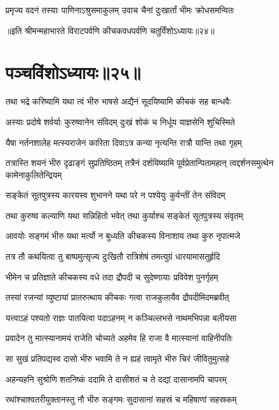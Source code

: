 \twolineshloka
{प्रमृज्य वदनं तस्याः पाणिनाऽश्रुसमाकुलम्}
{उवाच चैनां दुःखार्तां भीमः क्रोधसमन्वितः}

॥इति श्रीमन्महाभारते विराटपर्वणि कीचकवधपर्वणि चतुर्विंशोऽध्यायः॥२४॥

\chapter{पञ्चविंशोऽध्यायः॥२५॥}

\twolineshloka
{तथा भद्रे करिष्यामि यथा त्वं भीरु भाषसे}
{अद्यैनं सूदयिष्यामि कीचकं सह बान्धवैः}


\twolineshloka
{अस्याः प्रदोषे शर्वर्याः कुरुष्वानेन संविदम्}
{दुःखं शोकं च निर्धूय याज्ञसेनि शुचिस्मिते}


\twolineshloka
{यैषा नर्तनशालेह मत्स्यराजेन कारिता}
{दिवाऽत्र कन्या नृत्यन्ति रात्रौ यान्ति तथा गृहम्}


\threelineshloka
{तत्रास्ति शयनं भीरु दृढाङ्गं सुप्रतिष्ठितम्}
{तत्रैनं दर्शयिष्यामि पूर्वप्रेतान्पितामहान्}
{त्वद्दर्शनसमुत्थेन कामेनाकुलितेन्द्रियम्}


\twolineshloka
{सङ्केतं सूतपुत्रस्य कारयस्व शुभानने}
{यथा परे न पश्येयुः कुर्वन्तीं तेन संविदम्}


\twolineshloka
{तथा कुरुष्व कल्याणि यथा सन्निहितो भवेत्}
{तथा कुर्याश्च सङ्केतं सूतपुत्रस्य संवृतम्}


\twolineshloka
{आवयोः सङ्गमं भीरु यथा मर्त्यो न बुध्यति}
{कीचकस्य विनाशाय तथा कुरु नृपात्मजे}



\twolineshloka
{तत्र तौ कथयित्वा तु बाष्पमुत्सृज्य दुःखितौ}
{रात्रिशेषं तमत्युग्रं धारयामासतुर्हृदि}


\twolineshloka
{भीमेन च प्रतिज्ञाते कीचकस्य वधे तदा}
{द्रौपदी च सुदेष्णायाः प्रविवेश पुनर्गृहम्}


\twolineshloka
{तस्यां रजन्यां व्युष्टायां प्रातरुत्थाय कीचकः}
{गत्वा राजकुलायैव द्रौपदीमिदमब्रवीत्}


\twolineshloka
{यत्त्वाऽहं पश्यतो राज्ञः पातयित्वा पदाऽहनम्}
{न कञ्चिल्लभसे नाथमभिपन्ना बलीयसा}


\twolineshloka
{प्रवादेन तु मात्स्यानामयं राजेति चोच्यते}
{अहमेव हि राजा वै मात्स्यानां वाहिनीपतिः}


\twolineshloka
{सा सुखं प्रतिपद्यस्व दासो भीरु भवामि ते}
{न ह्यहं त्वामृते भीरु चिरं जीवितुमुत्सहे}


\twolineshloka
{अहन्यहनि सुश्रोणि शतनिष्कं ददामि ते}
{दासीशतं च ते दद्यां दासानामपि चापरम्}


\twolineshloka
{रथांश्चाश्वतरीयुक्तानस्तु नौ भीरु सङ्गमः}
{सुदासानां सहस्रं च महिषाणां सहस्रकम्}


